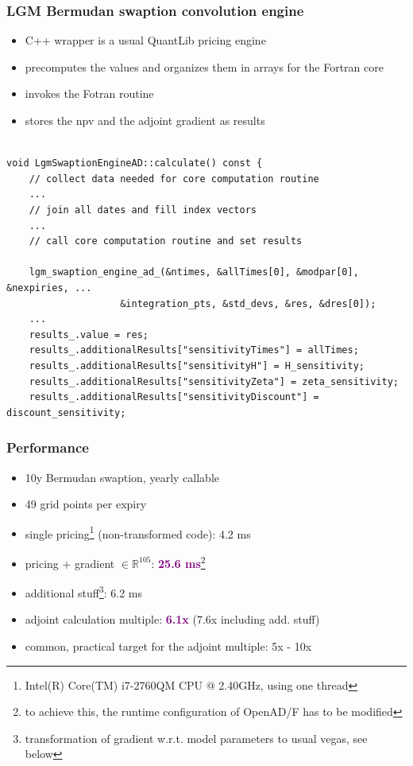 \documentclass[10pt,German]{beamer}
\begin{document}
\begin{frame}[fragile]
\frametitle{LGM Bermudan swaption convolution engine}
\begin{itemize}
\item C++ wrapper is a usual QuantLib pricing engine
\item precomputes the values and organizes them in arrays for the Fortran core
\item invokes the Fotran routine
\item stores the npv and the adjoint gradient as results
\end{itemize}
\begin{verbatim}

void LgmSwaptionEngineAD::calculate() const {
    // collect data needed for core computation routine
    ...
    // join all dates and fill index vectors
    ...
    // call core computation routine and set results

    lgm_swaption_engine_ad_(&ntimes, &allTimes[0], &modpar[0], &nexpiries, ...
                    &integration_pts, &std_devs, &res, &dres[0]);
    ...
    results_.value = res;
    results_.additionalResults["sensitivityTimes"] = allTimes;
    results_.additionalResults["sensitivityH"] = H_sensitivity;
    results_.additionalResults["sensitivityZeta"] = zeta_sensitivity;
    results_.additionalResults["sensitivityDiscount"] = discount_sensitivity;
\end{verbatim}
\end{frame}

\begin{frame}[fragile]
\frametitle{Performance}
\begin{itemize}
\item 10y Bermudan swaption, yearly callable
\item 49 grid points per expiry
\item single pricing\footnote{Intel(R) Core(TM) i7-2760QM CPU @ 2.40GHz, using one thread} (non-transformed code): 4.2 ms
\item pricing + gradient $\in \mathbb{R}^{105}$: \textcolor{purple}{\textbf{25.6 ms}}\footnote{to achieve this, the runtime configuration of OpenAD/F has to be modified}
\item additional stuff\footnote{transformation of gradient w.r.t. model parameters to usual vegas, see below}: 6.2 ms
\item adjoint calculation multiple: \textcolor{purple}{\textbf{6.1x}} (7.6x including add. stuff)
\item common, practical target for the adjoint multiple: 5x - 10x
\end{itemize}
\end{frame}
\end{document}

